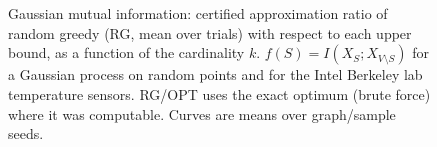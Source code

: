 \begin{figure}[t]
\centering
\setlength{\rgplotwidth}{0.49\columnwidth}
\\[1pt]
\hfill
\\

\caption{Gaussian mutual information: certified approximation ratio of random greedy (RG, mean over trials) with respect to each upper bound, as a function of the cardinality $k$. $f(S)=I(X_S;X_{V\setminus S})$ for a Gaussian process on random points and for the Intel Berkeley lab temperature sensors. RG/OPT uses the exact optimum (brute force) where it was computable. Curves are means over graph/sample seeds.}
\label{fig:rg-gaussian_mi}
\end{figure}
